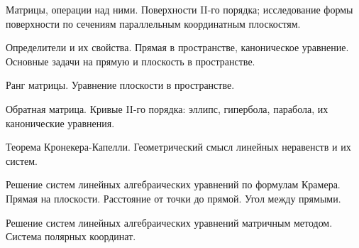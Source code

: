 \documentclass[
	14pt,
	a4paper,
	]
	{scrartcl}
\begin{document}
\shapk
{}
\setcounter{zad}{0}

\vfill
\z Матрицы, операции над ними. 
 \vfill
\z Поверхности II-го порядка; исследование формы поверхности по сечениям параллельным координатным плоскостям. \vfill

\vfill

\newpage


\shapk
{}
\setcounter{zad}{0}

\vfill
\z Определители и их свойства.
 \vfill
\z Прямая в пространстве, каноническое уравнение. Основные задачи на прямую и плоскость в пространстве.
 \vfill

\vfill

\newpage


\shapk
{}
\setcounter{zad}{0}

\vfill
\z Ранг матрицы.
 \vfill
\z Уравнение плоскости в пространстве.
 \vfill

\vfill

\newpage


\shapk
{}
\setcounter{zad}{0}

\vfill
\z Обратная матрица.
 \vfill
\z Кривые II-го порядка: эллипс, гипербола, парабола, их канонические уравнения.
 \vfill

\vfill

\newpage


\shapk
{}
\setcounter{zad}{0}

\vfill
\z Теорема Кронекера-Капелли.
 \vfill
\z Геометрический смысл линейных неравенств и их систем.
 \vfill

\vfill

\newpage


\shapk
{}
\setcounter{zad}{0}

\vfill
\z Решение систем линейных алгебраических уравнений по формулам Крамера.
 \vfill
\z Прямая на плоскости. Расстояние от точки до прямой. Угол между прямыми.
 \vfill

\vfill

\newpage


\shapk
{}
\setcounter{zad}{0}

\vfill
\z Решение систем линейных алгебраических уравнений матричным методом.
 \vfill
\z Система полярных координат.
 \vfill

\vfill

\newpage


\shapk
{}
\setcounter{zad}{0}
\end{document}
